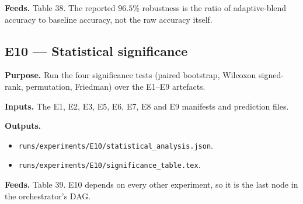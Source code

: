 \textbf{Feeds.} Table 38. The reported $96.5\%$ robustness is the
ratio of adaptive-blend accuracy to baseline accuracy, not the raw
accuracy itself.

\subsection{E10 --- Statistical significance}

\textbf{Purpose.} Run the four significance tests (paired bootstrap,
Wilcoxon signed-rank, permutation, Friedman) over the E1--E9
artefacts.

\textbf{Inputs.} The E1, E2, E3, E5, E6, E7, E8 and E9 manifests and
prediction files.

\textbf{Outputs.}
\begin{itemize}
\item \texttt{runs/experiments/E10/statistical\_analysis.json}.
\item \texttt{runs/experiments/E10/significance\_table.tex}.
\end{itemize}

\textbf{Feeds.} Table 39. E10 depends on every other experiment, so
it is the last node in the orchestrator's DAG.
